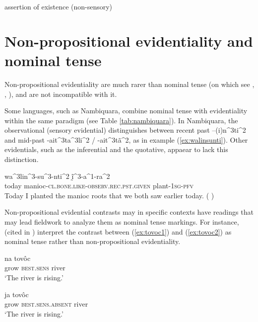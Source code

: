 \documentclass[oneside,a4paper,11pt]{article}
\newcommand{\ipa}[1]{{\phon \mbox{#1}}} %
\begin{document}
  assertion of existence (non-sensory)

\section{Non-propositional evidentiality and nominal tense}

Non-propositional evidentiality are much rarer than nominal tense (on which see \citealt{nordlinger04nominal}, \citealt{haude04tense}, \citealt[132]{francois05overview}), and are not incompatible with it.


Some languages, such as Nambiquara, combine nominal tense with evidentiality within the same paradigm (see Table \ref{tab:nambiquara}). In Nambiquara,  the observational (sensory evidential)  distinguishes between recent past \ipa{--(i)n^3ti^2} and mid-past \ipa{-ait^3ta^3li^2} /
\ipa{-ait^3tã^2}, as in example (\ref{ex:walinsunti}). Other evidentials, such as the inferential and the quotative, appaear to lack this distinction.

\begin{exe}
\ex \label{ex:walinsunti}
\gll  \ipa{hĩ^1na^2su^2} \ipa{wa^3lin^3-su^3-nti^2} \ipa{ḭ̃^3-a^1-ra^2} \\
today manioc-\textsc{cl.bone.like-observ.rec.pst.given} plant-\textsc{1sg-pfv} \\
\glt Today I planted the manioc roots that we both saw earlier today. (\citealt[290, ex 62.]{lowe99nambiquara} ) 
  \end{exe}

Non-propositional evidential contrasts may in specific contexts have readings that may lead fieldwork to analyze them as nominal tense markings. For instance, \citet[631]{campbell12chaco} (cited in \citealt{gutierrez14determiners}) interpret the contrast between (\ref{ex:tovoc1}) and (\ref{ex:tovoc2}) as nominal tense rather than non-propositional evidentiality.

\begin{exe}
\ex \label{ex:tovoc1}
\gll \ipa{tsej} \ipa{na} \ipa{tovôc} \\
  grow \textsc{best.sens} river \\
\glt `The river is rising.'
\end{exe}


\begin{exe}
\ex \label{ex:tovoc2}
\gll \ipa{tsej} \ipa{ja} \ipa{tovôc} \\
 grow \textsc{best.sens.absent} river \\
\glt `The river is rising.'
\end{exe}
\end{document}
